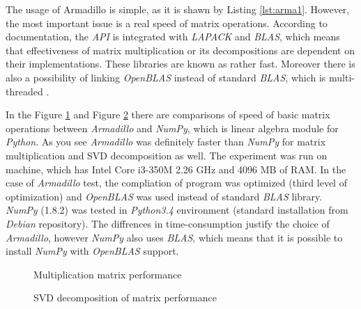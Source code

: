 The usage of Armadillo is simple, as it is shawn by Listing \ref{lst:arma1}. However, the most important issue is a real speed of matrix operations. According to documentation, the \textit{API} is integrated with \textit{LAPACK} and \textit{BLAS}, which means that effectiveness of matrix multiplication or its decompositions are dependent on their implementations. These libraries are known as rather fast. Moreover there is also a possibility of linking \textit{OpenBLAS} instead of standard \textit{BLAS}, which is multi-threaded \cite{Arma}. 

In the Figure \ref{fig:mul_perf} and Figure \ref{fig:svd_perf}  there are comparisons of speed of basic matrix operations between \textit{Armadillo} and \textit{NumPy}, which is linear algebra module for \textit{Python}. As you see \textit{Armadillo} was definitely faster than \textit{NumPy} for matrix multiplication and SVD decomposition as well.   
The experiment was run on machine, which has Intel Core i3-350M 2.26 GHz and 4096 MB of RAM. In the case of \textit{Armadillo} test, the compliation of program was optimized (third level of optimization) and \textit{OpenBLAS} was used instead of standard \textit{BLAS} library. \textit{NumPy} (1.8.2) was tested in \textit{Python3.4} environment (standard installation from \textit{Debian} repository). The diffrences in time-consumption justify the choice of \textit{Armadillo}, however \textit{NumPy} also uses \textit{BLAS}, which means that it is possible to install \textit{NumPy} with \textit{OpenBLAS} support.

\begin{figure}[h]
\centering
\label{fig:mul_perf}
\caption{Multiplication matrix performance}
\end{figure}

\begin{figure}
\centering
\label{fig:svd_perf}
\caption{SVD decomposition of matrix performance}
\end{figure}


